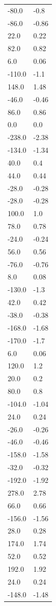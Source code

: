 \begin{longtable}{ll}
-80.0 & -0.8 \\
-86.0 & -0.86 \\
22.0 & 0.22 \\
82.0 & 0.82 \\
6.0 & 0.06 \\
-110.0 & -1.1 \\
148.0 & 1.48 \\
-46.0 & -0.46 \\
86.0 & 0.86 \\
0.0 & 0.0 \\
-238.0 & -2.38 \\
-134.0 & -1.34 \\
40.0 & 0.4 \\
44.0 & 0.44 \\
-28.0 & -0.28 \\
-28.0 & -0.28 \\
100.0 & 1.0 \\
78.0 & 0.78 \\
-24.0 & -0.24 \\
56.0 & 0.56 \\
-76.0 & -0.76 \\
8.0 & 0.08 \\
-130.0 & -1.3 \\
42.0 & 0.42 \\
-38.0 & -0.38 \\
-168.0 & -1.68 \\
-170.0 & -1.7 \\
6.0 & 0.06 \\
120.0 & 1.2 \\
20.0 & 0.2 \\
80.0 & 0.8 \\
-104.0 & -1.04 \\
24.0 & 0.24 \\
-26.0 & -0.26 \\
-46.0 & -0.46 \\
-158.0 & -1.58 \\
-32.0 & -0.32 \\
-192.0 & -1.92 \\
278.0 & 2.78 \\
66.0 & 0.66 \\
-156.0 & -1.56 \\
28.0 & 0.28 \\
174.0 & 1.74 \\
52.0 & 0.52 \\
192.0 & 1.92 \\
24.0 & 0.24 \\
-148.0 & -1.48 \\

\end{longtable}

